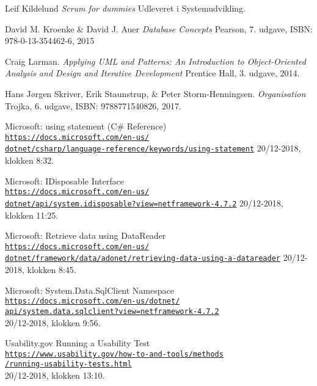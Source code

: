 \begin{thebibliography}{9}

Leif Kildelund
\textit{Scrum for dummies}
Udleveret i Systemudvikling.

David M. Kroenke \& David J. Auer
\textit{Database Concepts}
Pearson, 7. udgave, ISBN: 978-0-13-354462-6, 2015

Craig Larman.
\textit{Applying UML and Patterns: An Introduction to Object-Oriented Analysis and Design and Iterative Development}
Prentice Hall, 3. udgave, 2014.

Hans Jørgen Skriver, Erik Staunstrup, \& Peter Storm-Henningsen.
\textit{Organisation}
Trojka, 6. udgave, ISBN: 9788771540826, 2017.

Microsoft: using statement (C\# Reference)
\\\href{https://docs.microsoft.com/en-us/dotnet/csharp/language-reference/keywords/using-statement}{\texttt{https://docs.microsoft.com/en-us/\\dotnet/csharp/language-reference/keywords/using-statement}}
20/12-2018, klokken 8:32.

Microsoft: IDisposable Interface
\\\href{https://docs.microsoft.com/en-us/dotnet/api/system.idisposable?view=netframework-4.7.2}{\texttt{https://docs.microsoft.com/en-us/\\dotnet/api/system.idisposable?view=netframework-4.7.2}}
20/12-2018, klokken 11:25.

Microsoft: Retrieve data using DataReader
\\\href{https://docs.microsoft.com/en-us/dotnet/framework/data/adonet/retrieving-data-using-a-datareader}{\texttt{https://docs.microsoft.com/en-us/\\dotnet/framework/data/adonet/retrieving-data-using-a-datareader}}
20/12-2018, klokken 8:45.

Microsoft: System.Data.SqlClient Namespace
\\\href{https://docs.microsoft.com/en-us/dotnet/api/system.data.sqlclient?view=netframework-4.7.2}{\texttt{https://docs.microsoft.com/en-us/dotnet/\\api/system.data.sqlclient?view=netframework-4.7.2}}
\\20/12-2018, klokken 9:56.

Usability.gov Running a Usability Test
\\\href{https://www.usability.gov/how-to-and-tools/methods/running-usability-tests.html}{\texttt{https://www.usability.gov/how-to-and-tools/methods\\/running-usability-tests.html}}
\\20/12-2018, klokken 13:10.


\end{thebibliography}
